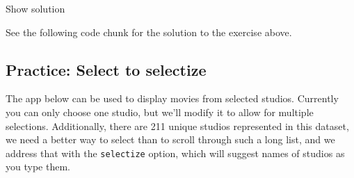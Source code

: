 \documentclass[
  letterpaper,
  DIV=11,
  numbers=noendperiod]{scrreprt}
\newenvironment{Shaded}{\begin{snugshade}}{\end{snugshade}}
\newcommand{\AttributeTok}[1]{\textcolor[rgb]{0.40,0.46,0.14}{#1}}
\newcommand{\CommentTok}[1]{\textcolor[rgb]{0.37,0.37,0.37}{#1}}
\newcommand{\ConstantTok}[1]{\textcolor[rgb]{0.56,0.35,0.01}{#1}}
\newcommand{\ControlFlowTok}[1]{\textcolor[rgb]{0.00,0.46,0.62}{#1}}
\newcommand{\DecValTok}[1]{\textcolor[rgb]{0.68,0.00,0.00}{#1}}
\newcommand{\FunctionTok}[1]{\textcolor[rgb]{0.28,0.35,0.67}{#1}}
\newcommand{\NormalTok}[1]{\textcolor[rgb]{0.00,0.46,0.62}{#1}}
\newcommand{\OtherTok}[1]{\textcolor[rgb]{0.00,0.46,0.62}{#1}}
\newcommand{\SpecialCharTok}[1]{\textcolor[rgb]{0.37,0.37,0.37}{#1}}
\begin{document}
\begin{Shaded}
\end{Shaded}

Show solution

See the following code chunk for the solution to the exercise above.

\hypertarget{practice-select-to-selectize}{%
\subsection{Practice: Select to
selectize}\label{practice-select-to-selectize}}

The app below can be used to display movies from selected studios.
Currently you can only choose one studio, but we'll modify it to allow
for multiple selections. Additionally, there are 211 unique studios
represented in this dataset, we need a better way to select than to
scroll through such a long list, and we address that with the
\texttt{selectize} option, which will suggest names of studios as you
type them.
\end{document}
